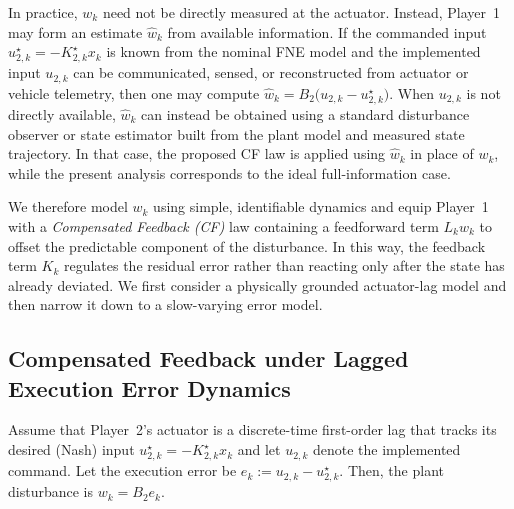 \documentclass[letterpaper, 10 pt, conference]{ieeeconf}  %
\begin{document}
In practice, $w_k$ need not be directly measured at the actuator. Instead, Player~1 may form an estimate $\hat w_k$ from available information. If the commanded input $u^\star_{2,k}=-K^\star_{2,k}x_k$ is known from the nominal FNE model and the implemented input $u_{2,k}$ can be communicated, sensed, or reconstructed from actuator or vehicle telemetry, then one may compute $\hat w_k = B_2\bigl(u_{2,k}-u^\star_{2,k}\bigr)$.
When $u_{2,k}$ is not directly available, $\hat w_k$ can instead be obtained using a standard disturbance observer or state estimator built from the plant model and measured state trajectory. In that case, the proposed CF law is applied using $\hat w_k$ in place of $w_k$, while the present analysis corresponds to the ideal full-information case.

We therefore model $w_k$ using simple, identifiable dynamics and equip Player~1 with a \textit{Compensated Feedback (CF)} law containing a feedforward term $L_k w_k$ to offset the predictable component of the disturbance. In this way, the feedback term $K_k$ regulates the residual error rather than reacting only after the state has already deviated. We first consider a physically grounded actuator-lag model and then narrow it down to a slow-varying error model.


\subsection{Compensated Feedback under Lagged Execution Error Dynamics}
\label{sec:lag-best-response}

Assume that Player~2’s actuator is a discrete-time first-order lag that tracks its desired (Nash) input $u^{\star}_{2,k}=-K^{\star}_{2,k}x_k$ and let $u_{2,k}$ denote the implemented command. Let the execution error be $e_k:=u_{2,k}-u^{\star}_{2,k}$. Then, the plant disturbance is $w_k=B_2 e_k$.
\end{document}
